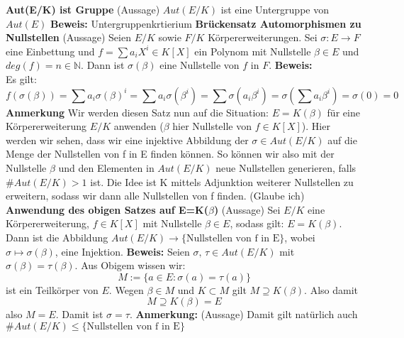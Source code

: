 \documentclass[a4paper, 10pt]{scrartcl}
\begin{document}
\textbf{Aut(E/K) ist Gruppe} (Aussage)\newline
$Aut(E/K)$ ist eine Untergruppe von $Aut(E)$
\newline
\textbf{Beweis:}\newline
Untergruppenkrtierium
\newline
\newline
\textbf{Brückensatz Automorphismen zu Nullstellen} (Aussage) \newline
Seien $E/K$ sowie $F/K$ Körpererweiterungen. Sei $\sigma : E \rightarrow F$ eine Einbettung und $f = \sum a_i X^i \in K[X]$ ein Polynom mit Nullstelle $\beta \in E$ und $deg(f)= n \in \mathbb{N}$.\newline
Dann ist $\sigma(\beta)$ eine Nullstelle von $f$ in $F$.\newline
\textbf{Beweis:}\\
Es gilt: $$f(\sigma(\beta)) = \sum a_i \sigma(\beta)^{i} = \sum a_i \sigma(\beta^{i}) = \sum \sigma(a_i \beta^{i}) =\sigma(\sum a_i \beta^{i}) = \sigma(0) = 0$$
\newline
\newline
\textbf{Anmerkung}\newline
Wir werden diesen Satz nun auf die Situation: $E=K(\beta)$ für eine Körpererweiterung $E/K$ anwenden ($\beta$ hier Nullstelle von $f \in K[X]$). Hier werden wir sehen, dass wir eine injektive Abbildung der $\sigma \in Aut(E/K)$  auf die Menge der Nullstellen von f in E finden können. So können wir also mit der Nullstelle $\beta$ und den Elementen in $Aut(E/K)$ neue Nullstellen generieren, falls $\#Aut(E/K) > 1$ ist. Die Idee ist K mittels Adjunktion weiterer Nullstellen zu erweitern, sodass wir dann alle Nullstellen von f finden. (Glaube ich)
\newline
\newline
\textbf{Anwendung des obigen Satzes auf E=K($\beta$)} (Aussage) \newline
Sei $E/K$ eine Körpererweiterung, $f \in K[X]$ mit Nullstelle $\beta \in E$, sodass gilt: $E=K(\beta)$. \newline Dann ist die Abbildung $Aut(E/K) \rightarrow \{\text{Nullstellen von f in E} \}$, wobei $\sigma \mapsto \sigma(\beta)$, eine Injektion.\newline
\textbf{Beweis:}\newline
Seien $\sigma \text{, } \tau \in Aut(E/K)$ mit $\sigma (\beta) = \tau (\beta)$. Aus Obigem wissen wir: $$M:=\{a \in E : \sigma (a) = \tau (a) \}$$ ist ein Teilkörper von $E$. Wegen $\beta \in M$ und $K \subset M$ gilt $M \supseteq K(\beta)$. Also damit $$M \supseteq K(\beta)=E$$ also $M=E$.\newline
Damit ist $\sigma = \tau$.
\newline
\newline
\textbf{Anmerkung:} (Aussage)\newline
Damit gilt natürlich auch $\#Aut(E/K) \leq \{\text{Nullstellen von f in E} \}$
\end{document}
